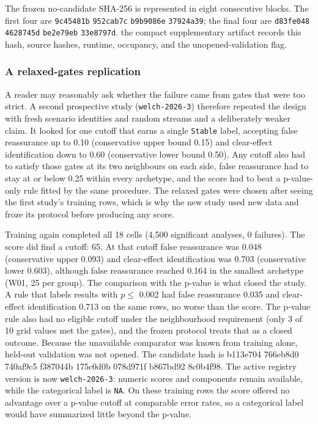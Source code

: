 The frozen no-candidate SHA-256 is represented in eight consecutive blocks.
The first four are \texttt{9c45481b} \texttt{952cab7c} \texttt{b9b9086e} \texttt{37924a39}; the final four
are \texttt{d83fe048} \texttt{4628745d} \texttt{be2e79eb} \texttt{33e8797d}.
the compact supplementary artifact records this hash, source hashes, runtime,
occupancy, and the unopened-validation flag.

\subsubsection{A relaxed-gates replication}\label{a-relaxed-gates-replication}

A reader may reasonably ask whether the failure came from gates that were too
strict. A second prospective study (\texttt{welch-2026-3}) therefore repeated the
design with fresh scenario identities and random streams and a deliberately
weaker claim. It looked for one cutoff that earns a single \texttt{Stable} label,
accepting false reassurance up to 0.10 (conservative upper bound 0.15) and
clear-effect identification down to 0.60 (conservative lower bound 0.50). Any
cutoff also had to satisfy those gates at its two neighbours on each side,
false reassurance had to stay at or below 0.25 within every archetype, and the
score had to beat a p-value-only rule fitted by the same procedure. The
relaxed gates were chosen after seeing the first study's training rows, which
is why the new study used new data and froze its protocol before producing any
score.

Training again completed all 18 cells
(4,500 significant analyses, 0
failures). The score did find a cutoff: 65. At that
cutoff false reassurance was 0.048 (conservative
upper 0.093) and
clear-effect identification was 0.703
(conservative lower 0.603),
although false reassurance reached 0.164
in the smallest archetype (W01, 25 per group). The
comparison with the p-value is what closed the study. A rule that labels
results with \(p \le\) 0.002 had false reassurance
0.035 and clear-effect identification
0.713 on the same rows, no worse than
the score. The p-value rule also had no eligible cutoff under the neighbourhood
requirement (only 3 of
10 grid values met the gates), and the frozen
protocol treats that as a closed outcome. Because the unavailable comparator
was known from training alone, held-out validation was not opened. The
candidate hash is b113e704 766eb8d0 740af9c5 f387044b 175c0d0b 078d971f b867bd92 8c0b4f98. The active registry
version is now \texttt{welch-2026-3}: numeric scores and components remain available,
while the categorical label is \texttt{NA}. On these training rows the score offered
no advantage over a p-value cutoff at comparable error rates, so a categorical
label would have summarized little beyond the p-value.

